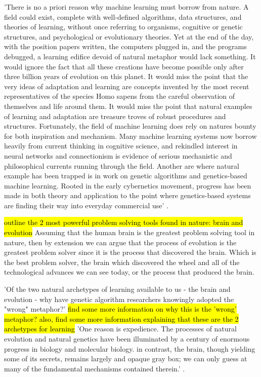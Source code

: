 'There is no a priori reason why machine learning must borrow from nature. A field could exist, complete with well-defined algorithms, data structures, and theories of learning, without once referring to organisms, cognitive or genetic structures, and psychological or evolutionary theories. Yet at the end of the day, with the position papers written, the computers plugged in, and the programs debugged, a learning edifice devoid of natural metaphor would lack something. It would ignore the fact that all these creations have become possible only after three billion years of evolution on this planet. It would miss the point that the very ideas of adaptation and learning are concepts invented by the most recent representatives of the species Homo sapens from the careful observation of themselves and life around them. It would miss the point that natural examples of learning and adaptation are treasure troves of robust procedures and structures. Fortunately, the field of machine learning does rely on natures bounty for both inspiration and mechanism. Many machine learning systems now borrow heavily from current thinking in cognitive science, and rekindled interest in neural networks and connectionism is evidence of serious mechanistic and philosophical currents running through the field. Another are where natural example has been trapped is in work on genetic algorithms and genetics-based machine learning. Rooted in the early cybernetics movement, progress has been made in both theory and application to the point where genetics-based systems are finding their way into everyday commercial use' \cite{goldberg1988genetic}.

\hl{outline the 2 most powerful problem solving tools found in nature: brain and evolution}
Assuming that the human brain is the greatest problem solving tool in nature, then by extension we can argue that the process of evolution is the greatest problem solver since it is the process that discovered the brain.
Which is the best problem solver, the brain which discovered the wheel and all of the technological advances we can see today, or the process that produced the brain.

'Of the two natural archetypes of learning available to us - the brain and evolution - why have genetic algorithm researchers knowingly adopted the "wrong" metaphor?' \cite{goldberg1988genetic} \hl{find some more information on why this is the 'wrong' metaphor? also, find some more information explaining that these are the 2 archetypes for learning}
'One reason is expedience. The processes of natural evolution and natural genetics have been illuminated by a century of enormous progress in biology and molecular biology. in contrast, the brain, though yielding some of its secrets, remains largely and opaque gray box; we can only guess at many of the fundamental mechanisms contained therein.' \cite{goldberg1988genetic}.




